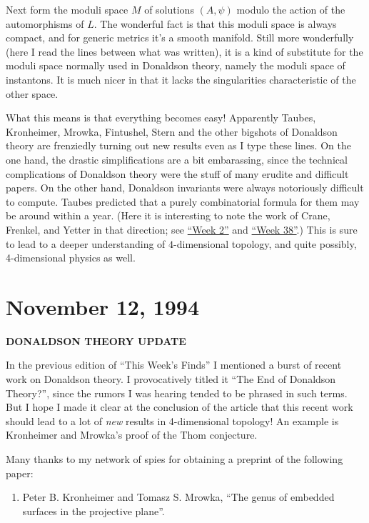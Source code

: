 \documentclass[12pt]{article}
\def\tightlist{}
\begin{document}
Next form the moduli space \(M\) of solutions \((A, \psi)\) modulo the
action of the automorphisms of \(L\). The wonderful fact is that this
moduli space is always compact, and for generic metrics it's a smooth
manifold. Still more wonderfully (here I read the lines between what was
written), it is a kind of substitute for the moduli space normally used
in Donaldson theory, namely the moduli space of instantons. It is much
nicer in that it lacks the singularities characteristic of the other
space.

What this means is that everything becomes easy! Apparently Taubes,
Kronheimer, Mrowka, Fintushel, Stern and the other bigshots of Donaldson
theory are frenziedly turning out new results even as I type these
lines. On the one hand, the drastic simplifications are a bit
embarassing, since the technical complications of Donaldson theory were
the stuff of many erudite and difficult papers. On the other hand,
Donaldson invariants were always notoriously difficult to compute.
Taubes predicted that a purely combinatorial formula for them may be
around within a year. (Here it is interesting to note the work of Crane,
Frenkel, and Yetter in that direction; see
\protect\hyperlink{week2}{``Week 2''} and
\protect\hyperlink{week38}{``Week 38''}.) This is sure to lead to a
deeper understanding of \(4\)-dimensional topology, and quite possibly,
4-dimensional physics as well.



\hypertarget{week45}{%
\section{November 12, 1994}\label{week45}}

\begin{center}
\textbf{DONALDSON THEORY UPDATE}
\end{center}

In the previous edition of ``This Week's Finds'' I mentioned a burst of
recent work on Donaldson theory. I provocatively titled it ``The End of
Donaldson Theory?'', since the rumors I was hearing tended to be phrased
in such terms. But I hope I made it clear at the conclusion of the
article that this recent work should lead to a lot of \emph{new} results
in 4-dimensional topology! An example is Kronheimer and Mrowka's proof
of the Thom conjecture.

Many thanks to my network of spies for obtaining a preprint of the
following paper:

\begin{enumerate}
\def\labelenumi{\arabic{enumi})}
\tightlist
\item
  Peter B. Kronheimer and Tomasz S. Mrowka, ``The genus of 
  embedded surfaces in the projective plane''.
\end{enumerate}
\end{document}
